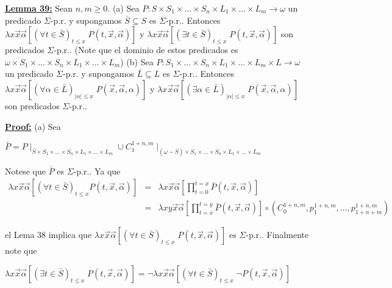   \textbf{\underline{Lemma 39:}} Sean \(n,m\geq 0\).
  (a) Sea \(P:S\times S_{1}\times ...\times S_{n}\times L_{1}\times ...\times L_{m}\rightarrow \omega \) un predicado \(\Sigma \)-p.r. y supongamos \(\bar{S}\subseteq S\) es \(\Sigma \)-p.r.. Entonces \(\lambda x\vec{x}\vec{\alpha }\left[ (\forall t\in \bar{S})_{t\leq x}\;P(t,\vec{x},\vec{\alpha})\right] \) y \(\lambda x\vec{x}\vec{\alpha}\left[ (\exists t\in \bar{S})_{t\leq x}\;P(t, \vec{x},\vec{\alpha})\right] \) son predicados \(\Sigma \)-p.r.. (Note que el dominio de estos predicados es \(\omega \times S_{1}\times ...\times S_{n}\times L_{1}\times ...\times L_{m}\))
  (b) Sea \(P:S_{1}\times ...\times S_{n}\times L_{1}\times ...\times L_{m}\times L\rightarrow \omega \) un predicado \(\Sigma \)-p.r. y supongamos \( \bar{L}\subseteq L\) es \(\Sigma \)-p.r.. Entonces \(\lambda x\vec{x}\vec{\alpha} \left[ (\forall \alpha \in \bar{L})_{\left\vert \alpha \right\vert \leq x}\;P(\vec{x},\vec{\alpha},\alpha )\right] \) y \(\lambda x\vec{x}\vec{\alpha} \left[ (\exists \alpha \in \bar{L})_{\left\vert \alpha \right\vert \leq x}\;P(\vec{x},\vec{\alpha},\alpha )\right] \) son predicados \(\Sigma \)-p.r..

  \textbf{\underline{Proof:}} (a) Sea

  \(\displaystyle \bar{P}=P\mid _{\bar{S}\times S_{1}\times ...\times S_{n}\times L_{1}\times ...\times L_{m}}\cup C_{1}^{1+n,m}\mid _{(\omega -\bar{S})\times S_{1}\times ...\times S_{n}\times L_{1}\times ...\times L_{m}} \)

  Notese que \(\bar{P}\) es \(\Sigma \)-p.r.. Ya que
  \(\displaystyle \begin{array}{rcl} \lambda x\vec{x}\vec{\alpha}\left[ (\forall t\in \bar{S})_{t\leq x}P(t,\vec{x },\vec{\alpha})\right] & =& \lambda x\vec{x}\vec{\alpha}\left[ \prod\limits_{t=0}^{t=x}\bar{P}(t,\vec{x},\vec{\alpha})\right] \\ & =& \lambda xy\vec{x}\vec{\alpha}\left[ \prod\limits_{t=x}^{t=y}\bar{P}(t, \vec{x},\vec{\alpha})\right] \circ \left( C_{0}^{1+n,m},p_{1}^{1+n,m},...,p_{1+n+m}^{1+n,m}\right) \end{array} \)

  el Lema 38 implica que \(\lambda x\vec{x}\vec{\alpha}\left[ (\forall t\in \bar{S})_{t\leq x}\;P(t,\vec{x},\vec{\alpha})\right] \) es \( \Sigma \)-p.r..
  Finalmente note que

  \(\displaystyle \lambda x\vec{x}\vec{\alpha}\left[ (\exists t\in \bar{S})_{t\leq x}\;P(t, \vec{x},\vec{\alpha})\right] =\lnot \lambda x\vec{x}\vec{\alpha}\left[ (\forall t\in \bar{S})_{t\leq x}\;\lnot P(t,\vec{x},\vec{\alpha})\right] \)

